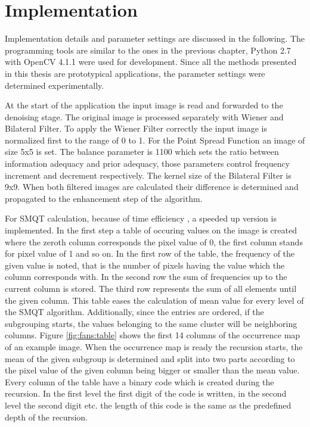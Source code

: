 \documentclass[draft,final]{vutinfth} %
\begin{document}
\section{Implementation}
\par
Implementation details and parameter settings are discussed  in the following.
The programming tools are similar to the ones in the previous chapter, Python 2.7 \cite{van1995python} with OpenCV 4.1.1 \cite{opencv_library} were used for development.
Since all the methods presented in this thesis are prototypical applications, the parameter settings were determined experimentally.
\par
At the start of the application the input image is read and forwarded to the denoising stage.
The original image is processed separately with Wiener and Bilateral Filter.
To apply the Wiener Filter correctly the input image is normalized first to the range of 0 to 1.
For the Point Spread Function an image of size 5x5 is set.
The balance parameter is 1100 which sets the ratio between information adequacy and prior adequacy, those parameters control frequency increment and decrement respectively.
The kernel size of the Bilateral Filter is 9x9.
When both filtered images are calculated their difference is determined and propagated to the enhancement step of the algorithm.
\par
For SMQT calculation, because of time efficiency , a speeded up version is implemented.
In the first step a table of occuring values on the image is created where the zeroth column corresponds the pixel value of 0, the first column stands for pixel value of 1 and so on.
In the first row of the table, the frequency of the given value is noted, that is the number of pixels having the value which the column corresponds with.
In the second row the sum of frequencies up to the current column is stored.
The third row represents the sum of all elements until the given column.
This table eases the calculation of mean value for every level of the SMQT algorithm.
Additionally, since the entries are ordered, if the subgrouping starts, the values belonging to the same cluster will be neighboring columns.
Figure \ref{fig:fans:table} shows the first 14 columns of the occurrence map of an example image.
When the occurrence map is ready the recursion starts, the mean of the given subgroup is determined and split into two parts according to the pixel value of the given column being bigger or smaller than the mean value. 
Every column of the table have a binary code which is created during the recursion.
In the first level the first digit of the code is written, in the second level the second digit etc. the length of this code is the same as the predefined depth of the recursion.
\end{document}
